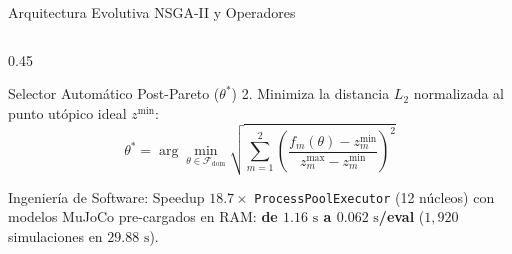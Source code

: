 \documentclass[aspectratio=169,9pt]{beamer}
\begin{document}
\begin{frame}{Arquitectura Evolutiva NSGA-II y Operadores}
\begin{columns}[T,onlytextwidth]
\begin{column}{0.45\textwidth}
\begin{exampleblock}{\footnotesize Selector Automático Post-Pareto ($\theta^*$)}
        2. Minimiza la distancia $L_2$ normalizada al punto utópico ideal $z^{\min}$:
        \vspace{-0.15cm}
        \[
            \theta^* = \arg\min_{\theta \in \mathcal{F}_{\text{dom}}} \sqrt{\sum_{m=1}^2 \left(\frac{f_m(\theta)-z_m^{\min}}{z_m^{\max}-z_m^{\min}}\right)^2}
        \]
        \vspace{-0.18cm}
    \end{exampleblock}
    \vspace{-0.1cm}
    \begin{alertblock}{\footnotesize Ingeniería de Software: Speedup $18.7\times$}
        \scriptsize
        \texttt{ProcessPoolExecutor} (12 núcleos) con modelos MuJoCo pre-cargados en RAM: \textbf{de $1.16\text{ s}$ a $0.062\text{ s}$/eval} ($1,920$ simulaciones en \textbf{$29.88\text{ s}$}).
    \end{alertblock}
\end{column}
\end{columns}
\end{frame}
\end{document}
